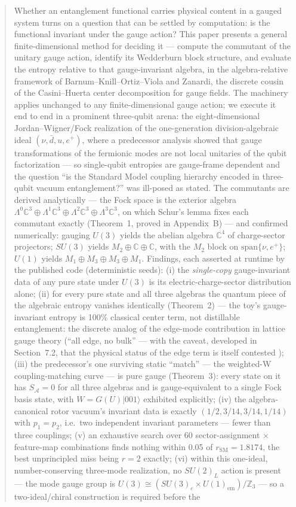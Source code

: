\documentclass[11pt]{article}
\newcommand{\CC}{\mathbb{C}}
\newcommand{\SA}{S_{\mathcal{A}}}
\newcommand{\rSM}{r_{\mathrm{SM}}}
\begin{document}
\begin{abstract}
Whether an entanglement functional carries physical content in a gauged system turns on a question that can be settled by computation: is the functional invariant under the gauge action? This paper presents a general finite-dimensional method for deciding it --- compute the commutant of the unitary gauge action, identify its Wedderburn block structure, and evaluate the entropy relative to that gauge-invariant algebra, in the algebra-relative framework of Barnum--Knill--Ortiz--Viola and Zanardi, the discrete cousin of the Casini--Huerta center decomposition for gauge fields. The machinery applies unchanged to any finite-dimensional gauge action; we execute it end to end in a prominent three-qubit arena: the eight-dimensional Jordan--Wigner/Fock realization of the one-generation division-algebraic ideal $(\nu, \bar d, u, e^+)$, where a predecessor analysis \cite{companion} showed that gauge transformations of the fermionic modes are not local unitaries of the qubit factorization --- so single-qubit entropies are gauge-frame dependent and the question ``is the Standard Model coupling hierarchy encoded in three-qubit vacuum entanglement?'' was ill-posed as stated. The commutants are derived analytically --- the Fock space is the exterior algebra $\Lambda^0\CC^3 \oplus \Lambda^1\CC^3 \oplus \Lambda^2\CC^3 \oplus \Lambda^3\CC^3$, on which Schur's lemma fixes each commutant exactly (Theorem~1, proved in Appendix~B) --- and confirmed numerically: gauging $U(3)$ yields the abelian algebra $\CC^4$ of charge-sector projectors; $SU(3)$ yields $M_2 \oplus \CC \oplus \CC$, with the $M_2$ block on $\mathrm{span}\{\nu, e^+\}$; $U(1)$ yields $M_1 \oplus M_3 \oplus M_3 \oplus M_1$. Findings, each asserted at runtime by the published code (deterministic seeds): (i) the \emph{single-copy} gauge-invariant data of any pure state under $U(3)$ is its electric-charge-sector distribution alone; (ii) for every pure state and all three algebras the quantum piece of the algebraic entropy vanishes identically (Theorem~2) --- the toy's gauge-invariant entropy is 100\% classical center term, not distillable entanglement: the discrete analog of the edge-mode contribution in lattice gauge theory (``all edge, no bulk'' --- with the caveat, developed in Section~7.2, that the physical status of the edge term is itself contested \cite{chmp}); (iii) the predecessor's one surviving static ``match'' --- the weighted-W coupling-matching curve --- is pure gauge (Theorem~3): every state on it has $\SA = 0$ for all three algebras and is gauge-equivalent to a single Fock basis state, with $W = G(U)|001\rangle$ exhibited explicitly; (iv) the algebra-canonical rotor vacuum's invariant data is exactly $(1/2, 3/14, 3/14, 1/14)$ with $p_1 = p_2$, i.e.\ two independent invariant parameters --- fewer than three couplings; (v) an exhaustive search over 60 sector-assignment $\times$ feature-map combinations finds nothing within 0.05 of $\rSM = 1.8174$, the best unprincipled miss being $r = 2$ exactly; (vi) within this one-ideal, number-conserving three-mode realization, no $SU(2)_L$ action is present --- the mode gauge group is $U(3) \cong (SU(3)_c \times U(1)_{\mathrm{em}})/\mathbb{Z}_3$ --- so a two-ideal/chiral construction is required before the 
\end{abstract}
\end{document}
